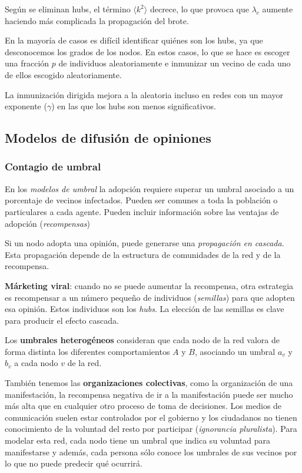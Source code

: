 \documentclass[10pt,spanish, landscape, twocolumn]{article}
\begin{document}
\begin{description}
\begin{enumerate}[\color{temasiete}{$\bigstar$}]
        Según se eliminan hubs, el término $\langle k^2 \rangle$ decrece, lo que provoca que $\lambda_c$ aumente haciendo más complicada la propagación del brote.

        En la mayoría de casos es difícil identificar quiénes son los hubs, ya que desconocemos los grados de los nodos. En estos casos, lo que se hace es escoger una fracción $p$ de individuos aleatoriamente e inmunizar un vecino de cada uno de ellos escogido aleatoriamente.

        La inmunización dirigida mejora a la aleatoria incluso en redes con un mayor exponente ($\gamma$) en las que los hubs son menos significativos.
    \end{enumerate}
\end{description}

\subsection{\textcolor{temasiete}Modelos de difusión de opiniones}
\subsubsection{\textcolor{temasiete}Contagio de umbral}
En los \textit{\textcolor{temasiete}{modelos de umbral}} la adopción requiere superar un umbral asociado a un porcentaje de vecinos infectados. Pueden ser comunes a toda la población o particulares a cada agente. Pueden incluir información sobre las ventajas de adopción (\textit{\textcolor{temasiete}{recompensas}})

Si un nodo adopta una opinión, puede generarse una \textit{\textcolor{temasiete}{propagación en cascada}}. Esta propagación depende de la estructura de comunidades de la red y de la recompensa.

\textbf{\textcolor{temasiete}{Márketing viral}}: cuando no se puede aumentar la recompensa, otra estrategia es recompensar a un número pequeño de individuos (\textit{\textcolor{temasiete}{semillas}}) para que adopten esa opinión. Estos individuos son los \textit{\textcolor{temasiete}{hubs}}. La elección de las semillas es clave para producir el efecto cascada.

Los \textbf{\textcolor{temasiete}{umbrales heterogéneos}} consideran que cada nodo de la red valora de forma distinta los diferentes comportamientos $A$ y $B$, asociando un umbral $a_v$ y $b_v$ a cada nodo $v$ de la red. 

También tenemos las \textbf{\textcolor{temasiete}{organizaciones colectivas}}, como la organización de una manifestación, la recompensa negativa de ir a la manifestación puede ser mucho más alta que en cualquier otro proceso de toma de decisiones. Los medios de comunicación suelen estar controlados por el gobierno y los ciudadanos no tienen conocimiento de la voluntad del resto por participar (\textit{\textcolor{temasiete}{ignorancia pluralista}}). Para modelar esta red, cada nodo tiene un umbral que indica su voluntad para manifestarse y además, cada persona sólo conoce los umbrales de sus vecinos por lo que no puede predecir qué ocurrirá.
\end{document}
